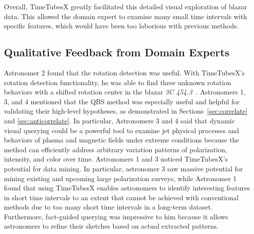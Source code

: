 Overall, TimeTubesX greatly facilitated this detailed visual exploration of blazar data. This allowed the domain expert to examine many small time intervals with specific features, which would have been too laborious with previous methods.


\subsection{Qualitative Feedback from Domain Experts}\label{sec:feedback}
Astronomer 2 found that the rotation detection was useful. 
With TimeTubesX's rotation detection functionality, 
he was able to find three unknown rotation behaviors with a shifted rotation center in the blazar \emph{3C 454.3}~\cite{Huang2019}. 
Astronomers 1, 3, and 4 mentioned that the QBS method was especially useful and helpful for validating their high-level hypotheses, as demonstrated in Sections~\ref{sec:correlate} and \ref{sec:anticorrelate}. 
In particular, Astronomers 3 and 4 said that dynamic visual querying could be a powerful tool to examine jet physical processes and behaviors of plasma and magnetic fields under extreme conditions because the method can efficiently address arbitrary variation patterns of polarization, intensity, and color over time. Astronomers 1 and 3 noticed TimeTubesX’s potential for data mining. In particular, astronomer 3 saw massive potential for mining existing and upcoming large polarization surveys, while Astronomer 1 found that using TimeTubesX enables astronomers to identify interesting features in short time intervals to an extent that cannot be achieved with conventional methods due to too many short time intervals in a long-term dataset. Furthermore, fact-guided querying was impressive to him because it allows astronomers to refine their sketches based on actual extracted patterns.


